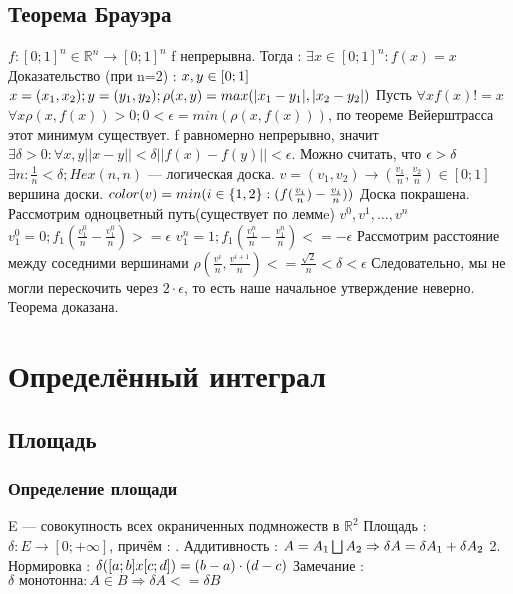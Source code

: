 \documentclass[12pt, a4paper]{article}
\newcommand{\nl}{\newline}
\begin{document}
        \subsection{Теорема Брауэра}
        $f : [0; 1]^n \in \mathbb{R}^n \rightarrow [0; 1]^n$ \nl
        f непрерывна. \nl
        Тогда : $\exists x \in [0; 1]^n : f(x) = x$ \nl
        Доказательство (при n=2) : \nl
        $x, y \in [0; 1] \nl$
        $x = (x_1, x_2); y = (y_1, y_2); \rho(x,y) = max(|x_1-y_1|, |x_2-y_2|) \nl$
        Пусть $ \forall x f(x) != x$ \nl
        $\forall x \rho(x, f(x))>0 ; 0 < \epsilon = min(\rho(x, f(x)))$, по теореме Вейерштрасса этот минимум существует. \nl
        f равномерно непрерывно, значит $\exists \delta > 0 : \forall x,y ||x-y|| < \delta ||f(x)-f(y)|| < \epsilon$. Можно считать, что $\epsilon > \delta \nl$
        $ \exists n : \frac{1}{n} < \delta; Hex(n , n)$ — логическая доска.
        $v = (v_1, v_2) \rightarrow (\frac{v_1}{n}, \frac{v_2}{n}) \in [0; 1]$ вершина доски. \nl
        $color(v) = min(i \in \{1, 2\} : (f(\frac{v_i}{n})-\frac{v_i}{n})) \nl$ 
        Доска покрашена. \nl
        Рассмотрим одноцветный путь(существует по леммe) $v^0, v^1, \ldots , v^n$ \nl
        $v^0_1 = 0; f_1(\frac{v^0_1}{n}-\frac{v^0_1}{n}) >=\epsilon$ \nl
        $v^n_1 = 1; f_1(\frac{v^n_1}{n}-\frac{v^n_1}{n}) <=-\epsilon$ \nl
        Рассмотрим расстояние между соседними вершинами \nl
        $\rho(\frac{v^i}{n}, \frac{v^{i+1}}{n}) <= \frac{\sqrt{2}}{n} < \delta < \epsilon$ \nl
        Следовательно, мы не могли перескочить через $2 \cdot \epsilon$, то есть наше начальное утверждение неверно. \nl
        Теорема доказана.
        
\section{Определённый интеграл}
    \subsection{Площадь}
        \subsubsection{Определение площади}
        E — совокупность всех окраниченных подмножеств в $\mathbb{R}^2$ \nl
        Площадь : $\delta : E \rightarrow [0; +\infty]$, причём : \nl
        1. Аддитивность : $A = A_1 \bigsqcup A_2 \Rightarrow \delta A = \delta A_1 + \delta A_2 \nl$
        2. Нормировка : $\delta([a; b] x [c; d]) = (b-a) \cdot (d-c) \nl$
            Замечание : $\delta \text{ монотонна} : A \in B \Rightarrow \delta A <= \delta B$
        
\end{document}
